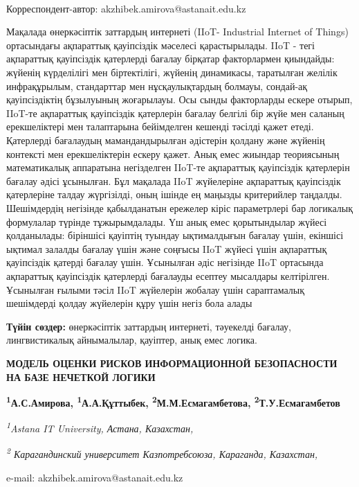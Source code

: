 {\bfseries \textsuperscript{\envelope }}Корреспондент-автор:
akzhibek.amirova@astanait.edu.kz

Мақалада өнеркәсіптік заттардың интернеті (IIoT- Industrial Internet of
Things) ортасындағы ақпараттық қауіпсіздік мәселесі қарастырылады. IIoT
- тегі ақпараттық қауіпсіздік қатерлерді бағалау бірқатар факторлармен
қиындайды: жүйенің күрделілігі мен біртектілігі, жүйенің динамикасы,
таратылған желілік инфрақұрылым, стандарттар мен нұсқаулықтардың
болмауы, сондай-ақ қауіпсіздіктің бұзылуының жоғарылауы. Осы сынды
факторларды ескере отырып, IIoT-те ақпараттық қауіпсіздік қатерлерін
бағалау белгілі бір жүйе мен саланың ерекшеліктері мен талаптарына
бейімделген кешенді тәсілді қажет етеді. Қатерлерді бағалаудың
мамандандырылған әдістерін қолдану және жүйенің контексті мен
ерекшеліктерін ескеру қажет. Анық емес жиындар теориясының математикалық
аппаратына негізделген IIoT-те ақпараттық қауіпсіздік қатерлерін бағалау
әдісі ұсынылған. Бұл мақалада IIoT жүйелеріне ақпараттық қауіпсіздік
қатерлеріне талдау жүргізілді, оның ішінде ең маңызды критерийлер
таңдалды. Шешімдердің негізінде қабылданатын ережелер кіріс параметрлері
бар логикалық формулалар түрінде тұжырымдалады. Үш анық емес
қорытындылар жүйесі қолданылады: біріншісі қауіптің туындау ықтималдығын
бағалау үшін, екіншісі ықтимал залалды бағалау үшін және соңғысы IIoT
жүйесі үшін ақпараттық қауіпсіздік қатерді бағалау үшін. Ұсынылған әдіс
негізінде IIoT ортасында ақпараттық қауіпсіздік қатерлерді бағалауды
есептеу мысалдары келтірілген. Ұсынылған ғылыми тәсіл IIoT жүйелерін
жобалау үшін сараптамалық шешімдерді қолдау жүйелерін құру үшін негіз
бола алады

{\bfseries Түйін сөздер:} өнеркәсіптік заттардың интернеті, тәуекелді
бағалау, лингвистикалық айнымалылар, қауіптер, анық емес логика.

{\bfseries МОДЕЛЬ ОЦЕНКИ РИСКОВ ИНФОРМАЦИОННОЙ БЕЗОПАСНОСТИ НА БАЗЕ
НЕЧЕТКОЙ ЛОГИКИ}

{\bfseries \textsuperscript{1}А.С.Амирова\textsuperscript{\envelope },
\textsuperscript{1}А.А.Құттыбек, \textsuperscript{2}М.М.Есмагамбетова,
\textsuperscript{2}Т.У.Есмагамбетов}

\emph{\textsuperscript{1}Astana IT University, Астана, Казахстан,}

\emph{\textsuperscript{2} Карагандинский университет Казпотребсоюза,
Караганда, Казахстан,}

e-mail: akzhibek.amirova@astanait.edu.kz

